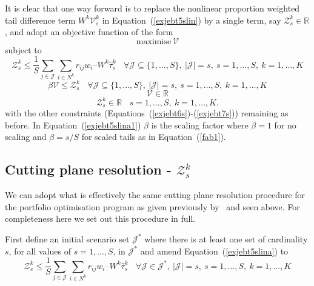 It is clear that one way forward is to replace the nonlinear proportion weighted tail difference term $ W^k \mathcal{V}_s^k$ 
in Equation~(\ref{exjebt5slin}) by a single term, say  $\mathcal{Z}_s^k \in\mathbb{R}$, and adopt an objective function of the form
\begin{equation}
\mbox{maximise}~\mathcal{V}
\label{exjebt4sz}
\end{equation}
subject to 
\begin{equation}
 \mathcal{Z}_s^k \leq \frac{1}{S} \sum_{j \in \mathcal{J}} \sum_{i \in N^k} r_{ij} w_i – W^k \hat{\tau}_s^k~~~~\forall \mathcal{J} \subseteq \{1, ..., S\},~|\mathcal{J}| = s,~s=1,\ldots,S,~k=1,\ldots,K
\label{exjebt5slina}
\end{equation}
\begin{equation}
\beta \mathcal{V} \leq  \mathcal{Z}_s^k  ~~~~\forall \mathcal{J} \subseteq \{1, ..., S\},~|\mathcal{J}| = s,~s=1,\ldots,S,~k=1,\ldots,K
\label{exjebt5slina1}
\end{equation}
\begin{equation}
 \mathcal{V} \in\mathbb{R}
\label{jebt8as}
\end{equation}
\begin{equation}
\mathcal{Z}_s^k \in\mathbb{R}~~~~s=1,\ldots,S,~k=1,\ldots,K.
\label{zreal}
\end{equation}
with the other constraints (Equations~(\ref{exjebt6s})-(\ref{exjebt7s})) remaining as before.  
In Equation~(\ref{exjebt5slina1}) $\beta$ is the scaling factor where $\beta{=}1$ for no scaling and $\beta{=}s/S$ for scaled tails as in Equation~(\ref{fab1}).




\subsection{Cutting plane resolution - $\mathcal{Z}_s^k$}
We can adopt what is effectively the same cutting plane resolution procedure for the portfolio optimisation program as given previously by~\cite{fabian2011} 
and seen above. For completeness here we set out this procedure in full.

First define an initial scenario set $\mathcal{J^*}$ where there is at least one set of cardinality $s$, for all values of $s=1,\ldots,S$, in $\mathcal{J^*}$ and amend Equation~(\ref{exjebt5slina}) to 
\begin{equation}
\mathcal{Z}_s^k \leq \frac{1}{S} \sum_{j \in \mathcal{J}} \sum_{i \in N^k} r_{ij} w_i – W^k \hat{\tau}_s^k~~~~\forall \mathcal{J} \in \mathcal{J^*},~|\mathcal{J}| = s,~s=1,\ldots,S,~k=1,\ldots,K
\label{exjebt6slina}
\end{equation}

